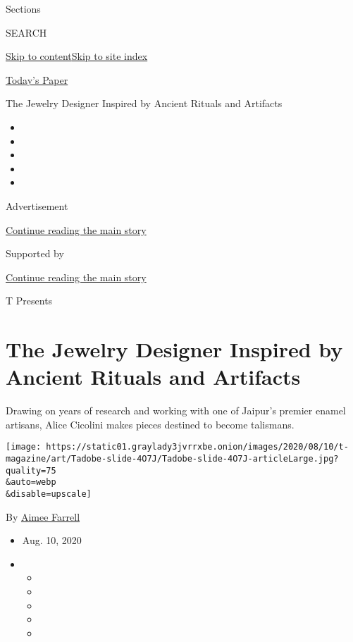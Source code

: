 Sections

SEARCH

\protect\hyperlink{site-content}{Skip to
content}\protect\hyperlink{site-index}{Skip to site index}

\href{https://myaccount.nytimes3xbfgragh.onion/auth/login?response_type=cookie\&client_id=vi}{}

\href{https://www.nytimes3xbfgragh.onion/section/todayspaper}{Today's
Paper}

The Jewelry Designer Inspired by Ancient Rituals and Artifacts

\begin{itemize}
\item
\item
\item
\item
\item
\end{itemize}

Advertisement

\protect\hyperlink{after-top}{Continue reading the main story}

Supported by

\protect\hyperlink{after-sponsor}{Continue reading the main story}

T Presents

\hypertarget{the-jewelry-designer-inspired-by-ancient-rituals-and-artifacts}{%
\section{The Jewelry Designer Inspired by Ancient Rituals and
Artifacts}\label{the-jewelry-designer-inspired-by-ancient-rituals-and-artifacts}}

Drawing on years of research and working with one of Jaipur's premier
enamel artisans, Alice Cicolini makes pieces destined to become
talismans.

\texttt{[image: https://static01.graylady3jvrrxbe.onion/images/2020/08/10/t-magazine/art/Tadobe-slide-4O7J/Tadobe-slide-4O7J-articleLarge.jpg?quality=75\\\&auto=webp\\\&disable=upscale]}

By \href{https://www.nytimes3xbfgragh.onion/by/aimee-farrell}{Aimee
Farrell}

\begin{itemize}
\item
  Aug. 10, 2020
\item
  \begin{itemize}
  \item
  \item
  \item
  \item
  \item
  \end{itemize}
\end{itemize}

